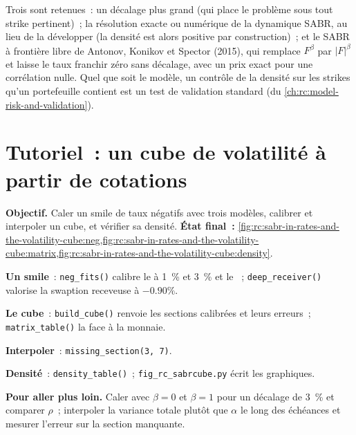 \begin{remark}\label{rem:rc:sabr-in-rates-and-the-volatility-cube:free}
Trois sont retenues~: un décalage plus grand (qui place le problème sous tout strike pertinent)~;
la résolution exacte ou numérique de la dynamique SABR, au lieu de la développer (la
densité est alors positive par construction)~; et le SABR à frontière libre de
Antonov, Konikov et Spector (2015), qui remplace $F^\beta$ par $|F|^\beta$ et
laisse le taux franchir zéro sans décalage, avec un prix exact pour une
corrélation nulle. Quel que soit le modèle, un contrôle de la densité sur les strikes
qu'un portefeuille contient est un test de validation standard (du \cref{ch:rc:model-risk-and-validation}).
\end{remark}

\section{Tutoriel~: un cube de volatilité à partir de cotations}\label{tut:rc:sabr-in-rates-and-the-volatility-cube:tutorial}

\begin{tutorial}
\textbf{Objectif.} Caler un smile de taux négatifs avec trois modèles, calibrer et
interpoler un cube, et vérifier sa densité. \textbf{État final~:}
\cref{fig:rc:sabr-in-rates-and-the-volatility-cube:neg,fig:rc:sabr-in-rates-and-the-volatility-cube:matrix,fig:rc:sabr-in-rates-and-the-volatility-cube:density}.
\begin{tutsteps}
\item \textbf{Un smile}~: \texttt{neg\_fits()} calibre le  à 1~\% et
3~\% et le ~; \texttt{deep\_receiver()} valorise la swaption receveuse à $-0.90\%$.
\item \textbf{Le cube}~: \texttt{build\_cube()} renvoie les sections calibrées et
leurs erreurs~; \texttt{matrix\_table()} la face à la monnaie.
\item \textbf{Interpoler}~: \texttt{missing\_section(3, 7)}.
\item \textbf{Densité}~: \texttt{density\_table()}~; \texttt{fig\_rc\_sabrcube.py}
écrit les graphiques.
\end{tutsteps}
\textbf{Pour aller plus loin.} Caler avec $\beta=0$ et $\beta=1$ pour un décalage de 3~\% et
comparer $\rho$~; interpoler la variance totale plutôt que $\alpha$ le long des échéances et
mesurer l'erreur sur la section manquante.
\end{tutorial}

